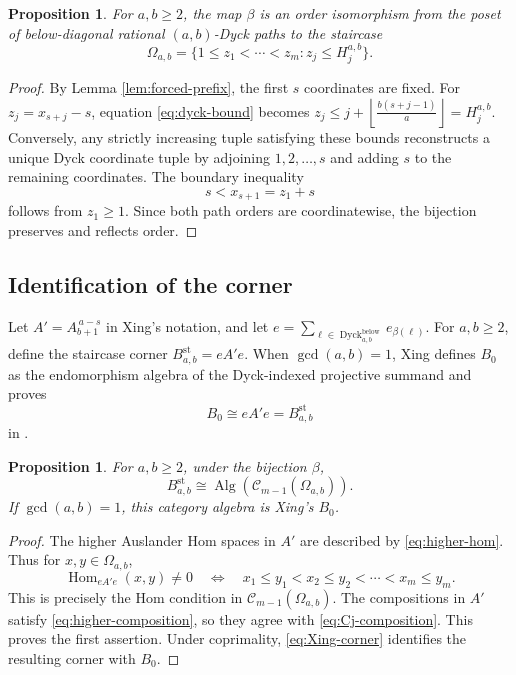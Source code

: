 \documentclass[12pt,a4paper,english,reqno]{amsart}
\theoremstyle{plain}
\newtheorem{proposition}[theorem]{Proposition}
\theoremstyle{definition}
\newcommand{\Hom}{\operatorname{Hom}}
\newcommand{\Dyck}{\operatorname{Dyck}}
\newcommand{\C}{\mathcal C}
\begin{document}
\begin{proposition}
\label{prop:dyck-staircase}
For $a,b\geq2$, the map $\beta$ is an order isomorphism from the poset of below-diagonal
rational $(a,b)$-Dyck paths to the staircase
\begin{equation}
 \Omega_{a,b}
 =
 \{1\leq z_1<\cdots<z_m:
 z_j\leq H_j^{a,b}\}.
\label{eq:Omega-ab}
\end{equation}
\end{proposition}

\begin{proof}
By Lemma \ref{lem:forced-prefix}, the first $s$ coordinates are fixed.  For
$z_j=x_{s+j}-s$, equation \eqref{eq:dyck-bound} becomes $z_j
 \leq j+\left\lfloor\frac{b(s+j-1)}a\right\rfloor
 =H_j^{a,b}$.
Conversely, any strictly increasing tuple satisfying these bounds reconstructs
a unique Dyck coordinate tuple by adjoining $1,2,\ldots,s$ and adding $s$
to the remaining coordinates.  The boundary inequality
\[
 s<x_{s+1}=z_1+s
\]
follows from $z_1\geq1$.  Since both path orders are coordinatewise, the
bijection preserves and reflects order.
\end{proof}

\subsection{Identification of the corner}

Let $A'=A_{b+1}^{\,a-s}$ in Xing's notation, and let $e=\sum_{\ell\in\Dyck^{\mathrm{below}}_{a,b}}e_{\beta(\ell)}$.
For $a,b\geq2$, define the staircase corner $B^{\mathrm{st}}_{a,b}=eA'e$.
When $\gcd(a,b)=1$, Xing defines $B_0$ as the endomorphism algebra of
the Dyck-indexed projective summand and proves
\begin{equation}
 B_0\cong eA'e=B^{\mathrm{st}}_{a,b}
\label{eq:Xing-corner}
\end{equation}
in \cite[Proposition~4.33]{Xing}.

\begin{proposition}
\label{prop:B0-C}
For $a,b\geq2$, under the bijection $\beta$,
\[
 B^{\mathrm{st}}_{a,b}
 \cong
 \operatorname{Alg}\!\left(\C_{m-1}(\Omega_{a,b})\right).
\]
If $\gcd(a,b)=1$, this category algebra is Xing's $B_0$.
\end{proposition}

\begin{proof}
The higher Auslander Hom spaces in $A'$ are described by
\eqref{eq:higher-hom}.  Thus for $x,y\in\Omega_{a,b}$,
\[
 \Hom_{eA'e}(x,y)\neq0
\quad\Longleftrightarrow\quad
x_1\leq y_1<x_2\leq y_2<\cdots<x_m\leq y_m.
\]
This is precisely the Hom condition in
$\C_{m-1}(\Omega_{a,b})$.  The compositions in $A'$ satisfy
\eqref{eq:higher-composition}, so they agree with
\eqref{eq:Cj-composition}.  This proves the first assertion.  Under
coprimality, \eqref{eq:Xing-corner} identifies the resulting corner with
$B_0$.
\end{proof}
\end{document}
